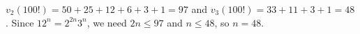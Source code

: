 $v_2(100!)=50+25+12+6+3+1=97$ and $v_3(100!)=33+11+3+1=48$. Since $12^n=2^{2n}3^n$, we need $2n\le97$ and $n\le48$, so $n=\boxed{48}$.
